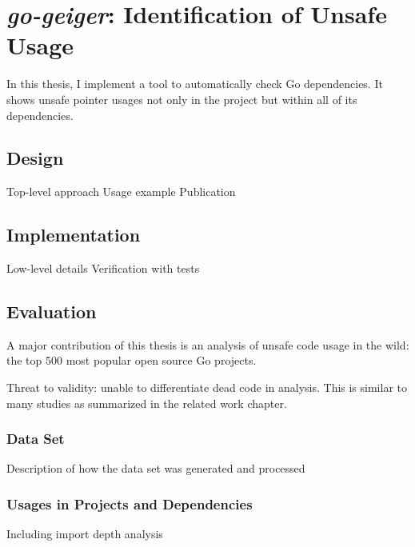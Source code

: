 \chapter{\textit{go-geiger}: Identification of Unsafe Usage}\label{ch:go-geiger}

In this thesis, I implement a tool to automatically check Go dependencies. It shows unsafe
pointer usages not only in the project but within all of its dependencies.




\section{Design}



Top-level approach
Usage example
Publication


\section{Implementation}

Low-level details
Verification with tests


\section{Evaluation}

A major contribution of this thesis is an analysis of unsafe code usage in the wild:
the top 500 most popular open source Go projects.

Threat to validity: unable to differentiate dead code in analysis.
This is similar to many studies as summarized in the related work chapter.


\subsection{Data Set}

Description of how the data set was generated and processed


\subsection{Usages in Projects and Dependencies}

Including import depth analysis






